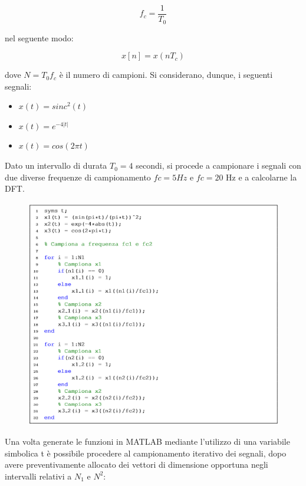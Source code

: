 \begin{equation}
	f_c = \frac{1}{T_0}
\end{equation}

nel seguente modo:

\begin{equation}
	x[n] = x(nT_c)
\end{equation}

dove $N=T_0 f_c$ è il numero di campioni. Si considerano, dunque, i seguenti 
segnali:

\begin{itemize}
	\item $x(t) = sinc^2 (t)$
	\item $x(t) = e^{-4|t|}$
	\item $x(t) = cos(2 \pi t)$
\end{itemize}


Dato un intervallo di durata $T_0 = 4$ secondi, si procede a campionare i 
segnali con due diverse frequenze di campionamento $fc = 5 Hz$ e $fc = 20$ 
Hz e a calcolarne la DFT.

\begin{minipage}[t]{.6\textwidth}
	\begin{figure}[H]
		\centering
		\includegraphics[width=\textwidth]{./images/cap3/campionamento_iterativo.png}
	\end{figure}
\end{minipage}
\hfill
\begin{minipage}[t]{.3\textwidth}
	\vspace*{1cm}
	Una volta generate le funzioni in MATLAB mediante l’utilizzo di una variabile 
	simbolica t è possibile procedere al campionamento iterativo dei segnali, dopo 
	avere preventivamente allocato dei vettori di dimensione opportuna negli 
	intervalli relativi a $N_1$ e $N^2$:
\end{minipage}

